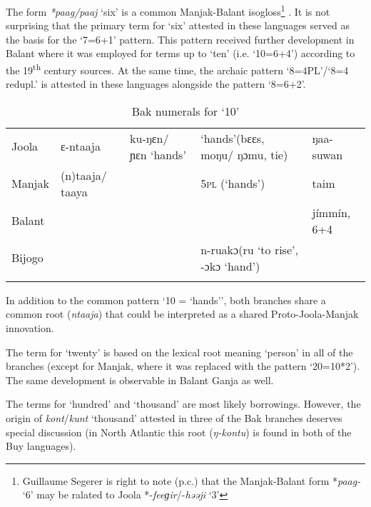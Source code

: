 The form \textit{*paag/paaj} ‘six’ is a common Manjak-Balant isogloss\footnote{Guillaume Segerer is right to note (p.c.) that the Manjak-Balant form *\textit{paag-} ‘6’ may be ralated to Joola  *-\textit{feeɡir}/-\textit{həəji} ‘3’} . It is not surprising that the primary term for ‘six’ attested in these languages served as the basis for the ‘7=6+1’ pattern. This pattern received further development in Balant where it was employed for terms up to ‘ten’ (i.e. ‘10=6+4’) according to the 19\textsuperscript{th} century sources. At the same time, the archaic pattern ‘8=4PL’/‘8=4 redupl.’ is attested in these languages alongside the pattern ‘8=6+2’.


\begin{table}
\caption{\label{tab:3:246}Bak numerals for `10'}


\begin{tabularx}{\textwidth}{llQQl}
\lsptoprule

{Joola} & ɛ-ntaaja\footnotemark{} & ku-ŋɛn/ ɲɛn `hands' & `hands'\newline (bɛɛs, moŋu/ ŋɔmu, tie) & ŋaa-suwan\\
{Manjak} & (n)taaja/ taaya &  & 5\textsc{pl} (‘hands’) & taim\\
{Balant} &  &  &  & jímmín, 6+4\\
{Bijogo} &  &  & n-ruakɔ\newline (ru ‘to rise’, -ɔkɔ ‘hand’) & \\
\lspbottomrule
\end{tabularx}
\end{table}

In addition to the common pattern ‘10 = ‘hands’’, both branches share a common root (\textit{ntaaja}) that could be interpreted as a shared Proto-Joola-Manjak innovation.


The term for ‘twenty’ is based on the lexical root meaning ‘person’ in all of the branches (except for Manjak, where it was replaced with the pattern ‘20=10*2’). The same development is observable in Balant Ganja as well.

The terms for ‘hundred’ and ‘thousand’ are most likely borrowings. However, the origin of \textit{kont}/\textit{kunt} ‘thousand’ attested in three of the Bak branches deserves special discussion (in North Atlantic this root (\textit{ŋ-kontu}) is found in both of the Buy languages).

